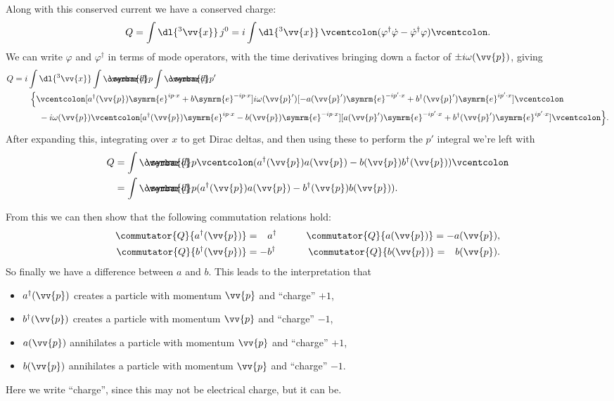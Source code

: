 \documentclass[fleqn]{NotesClass}
\newcommand{\e}{\symrm{e}}
\newcommand{\hermit}{{\dagger}}
\newcommand\dbar{\ThisStyle{\ensurestackMath{%
            \stackengine{-.3\LMpt}{\SavedStyle \symrm{d}}{\SavedStyle\overbar{}%
                \mkern2.25mu}{O}{r}{F}{F}{L}}}}
\newcommand{\invariantmeasure}[1]{\dbar #1}
\newcommand{\normalordering}[1]{\mathopen{\vcentcolon}{#1}\mathclose{\vcentcolon}}
\begin{document}
    Along with this conserved current we have a conserved charge:
    \begin{equation}
        Q = \int \dl{^3\vv{x}} \, j^0 = i\int \dl{^3\vv{x}} \, \normalordering{(\varphi^\hermit \dot{\varphi} - \dot{\varphi}^\hermit \varphi)}.
    \end{equation}
    We can write \(\varphi\) and \(\varphi^\hermit\) in terms of mode operators, with the time derivatives bringing down a factor of \(\pm i\omega(\vv{p})\), giving
    \begin{align}
        Q &= i \int \dl{^3\vv{x}} \int \invariantmeasure{p} \int \invariantmeasure{p'}\\
        &\quad\quad \Big\{ \normalordering{[a^\hermit(\vv{p}) \e^{ip \cdot x} + b\e^{-ip \cdot x}]i\omega(\vv{p}')[-a(\vv{p}')\e^{-ip'\cdot x} + b^\hermit(\vv{p}')\e^{ip'\cdot x}]} \notag\\
        &\qquad\quad -i\omega(\vv{p})\normalordering{[a^\hermit(\vv{p})\e^{ip\cdot x} - b(\vv{p})\e^{-ip\cdot x}] [a(\vv{p}')\e^{-ip'\cdot x} + b^\hermit(\vv{p}')\e^{ip'\cdot x}]} \Big\}.\notag
    \end{align}
    After expanding this, integrating over \(x\) to get Dirac deltas, and then using these to perform the \(p'\) integral we're left with
    \begin{align}
        Q &= \int \invariantmeasure{p} \normalordering{(a^\hermit(\vv{p})a(\vv{p}) - b(\vv{p}) b^\hermit(\vv{p}))}\\
        &= \int \invariantmeasure{p} (a^\hermit(\vv{p}) a(\vv{p}) - b^\hermit(\vv{p})b(\vv{p})).
    \end{align}
    
    From this we can then show that the following commutation relations hold:
    \begin{alignat}{2}
        \commutator{Q}{a^\hermit(\vv{p})} &= \hphantom{-}a^\hermit \qquad & \commutator{Q}{a(\vv{p})} = -a(\vv{p}),\\
        \commutator{Q}{b^\hermit(\vv{p})} &= -b^\hermit \qquad & \commutator{Q}{b(\vv{p})} = \hphantom{-}b(\vv{p}).
    \end{alignat}
    So finally we have a difference between \(a\) and \(b\).
    This leads to the interpretation that
    \begin{itemize}
        \item \(a^\hermit(\vv{p})\) creates a particle with momentum \(\vv{p}\) and \enquote{charge} \(+1\),
        \item \(b^\hermit(\vv{p})\) creates a particle with momentum \(\vv{p}\) and \enquote{charge} \(-1\),
        \item \(a(\vv{p})\) annihilates a particle with momentum \(\vv{p}\) and \enquote{charge} \(+1\),
        \item \(b(\vv{p})\) annihilates a particle with momentum \(\vv{p}\) and \enquote{charge} \(-1\).
    \end{itemize}
    Here we write \enquote{charge}, since this may not be electrical charge, but it can be.
    
\end{document}
